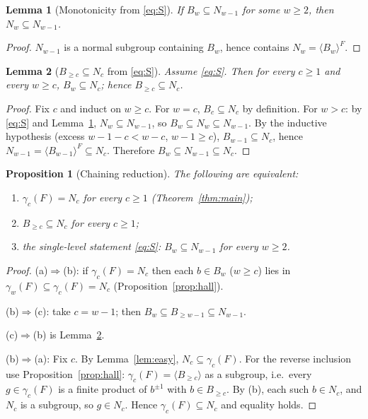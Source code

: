 \documentclass{amsart}
\newtheorem{lemma}{Lemma}
\newtheorem{proposition}{Proposition}
\theoremstyle{definition}
\theoremstyle{remark}
\begin{document}
\begin{lemma}[Monotonicity from \eqref{eq:S}]\label{lem:mono}
If $B_w\subseteq N_{w-1}$ for some $w\ge2$, then $N_w\subseteq N_{w-1}$.
\end{lemma}
\begin{proof}
$N_{w-1}$ is a normal subgroup containing $B_w$, hence contains $N_w=\langle
B_w\rangle^{F}$.
\end{proof}

\begin{lemma}[$B_{\ge c}\subseteq N_c$ from \eqref{eq:S}]\label{lem:Bgec}
Assume \eqref{eq:S}. Then for every $c\ge1$ and every $w\ge c$, $B_w\subseteq N_c$;
hence $B_{\ge c}\subseteq N_c$.
\end{lemma}
\begin{proof}
Fix $c$ and induct on $w\ge c$. For $w=c$, $B_c\subseteq N_c$ by definition. For
$w>c$: by \eqref{eq:S} and Lemma~\ref{lem:mono}, $N_w\subseteq N_{w-1}$, so
$B_w\subseteq N_w\subseteq N_{w-1}$. By the inductive hypothesis (excess
$w-1-c<w-c$, $w-1\ge c$), $B_{w-1}\subseteq N_c$, hence
$N_{w-1}=\langle B_{w-1}\rangle^{F}\subseteq N_c$. Therefore $B_w\subseteq
N_{w-1}\subseteq N_c$.
\end{proof}

\begin{proposition}[Chaining reduction]\label{prop:chain}
The following are equivalent:
\begin{enumerate}
\item[\textup{(a)}] $\gamma_c(F)=N_c$ for every $c\ge1$ \textup{(Theorem~\ref{thm:main})};
\item[\textup{(b)}] $B_{\ge c}\subseteq N_c$ for every $c\ge1$;
\item[\textup{(c)}] the single-level statement \eqref{eq:S}: $B_w\subseteq N_{w-1}$ for every $w\ge2$.
\end{enumerate}
\end{proposition}
\begin{proof}
(a)$\Rightarrow$(b): if $\gamma_c(F)=N_c$ then each $b\in B_w$ ($w\ge c$) lies in
$\gamma_w(F)\subseteq\gamma_c(F)=N_c$ (Proposition~\ref{prop:hall}).

(b)$\Rightarrow$(c): take $c=w-1$; then $B_w\subseteq B_{\ge w-1}\subseteq N_{w-1}$.

(c)$\Rightarrow$(b) is Lemma~\ref{lem:Bgec}.

(b)$\Rightarrow$(a): Fix $c$. By Lemma~\ref{lem:easy}, $N_c\subseteq\gamma_c(F)$. For
the reverse inclusion use Proposition~\ref{prop:hall}: $\gamma_c(F)=\langle B_{\ge
c}\rangle$ as a subgroup, i.e.\ every $g\in\gamma_c(F)$ is a finite product of
$b^{\pm1}$ with $b\in B_{\ge c}$. By (b), each such $b\in N_c$, and $N_c$ is a
subgroup, so $g\in N_c$. Hence $\gamma_c(F)\subseteq N_c$ and equality holds.
\end{proof}
\end{document}
